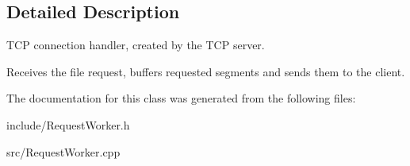 \subsection{Detailed Description}
T\+CP connection handler, created by the T\+CP server. 

Receives the file request, buffers requested segments and sends them to the client. 

The documentation for this class was generated from the following files\+:\begin{DoxyCompactItemize}
\item 
include/Request\+Worker.\+h\item 
src/Request\+Worker.\+cpp\end{DoxyCompactItemize}
